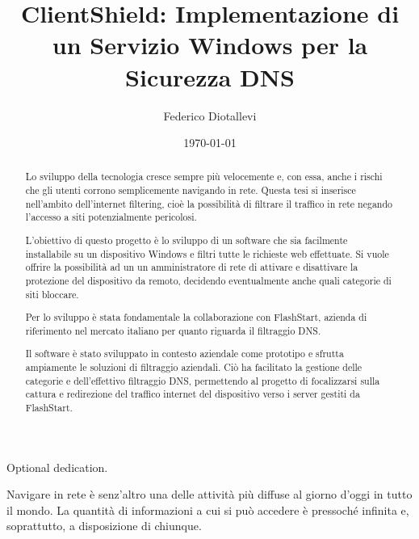 \documentclass[12pt,a4paper,openright,twoside]{book}
\title{ClientShield: Implementazione di un Servizio Windows per la Sicurezza DNS}
\author{Federico Diotallevi}
\date{\today}
\begin{document}
\frontmatter\frontispiece\

\renewcommand{\abstractname}{Sommario}
\begin{abstract}

Lo sviluppo della tecnologia cresce sempre più velocemente e, con essa, anche i rischi che gli utenti corrono semplicemente navigando in rete.
Questa tesi si inserisce nell'ambito dell'internet filtering, cioè la possibilità di filtrare il traffico in rete negando l'accesso a siti potenzialmente pericolosi.

L'obiettivo di questo progetto è lo sviluppo di un software che sia facilmente installabile su un dispositivo Windows e filtri tutte le richieste web effettuate.
Si vuole offrire la possibilità ad un un amministratore di rete di attivare e disattivare la protezione del dispositivo da remoto, decidendo eventualmente anche quali categorie di siti bloccare.

Per lo sviluppo è stata fondamentale la collaborazione con FlashStart, azienda di riferimento nel mercato italiano per quanto riguarda il filtraggio \gls{DNS}.

Il software è stato sviluppato in contesto aziendale come prototipo e sfrutta ampiamente le soluzioni di filtraggio aziendali.
Ciò ha facilitato la gestione delle categorie e dell'effettivo filtraggio \gls{DNS}, permettendo al progetto di focalizzarsi sulla cattura e redirezione del traffico internet del dispositivo verso i server gestiti da FlashStart.
\end{abstract}

\begin{dedication}
Optional dedication.
\end{dedication}

\tableofcontents   

\label{chap:introduzione}

Navigare in rete è senz'altro una delle attività più diffuse al giorno d'oggi in tutto il mondo.
La quantità di informazioni a cui si può accedere è pressoché infinita e, soprattutto, a disposizione di chiunque.
\end{document}
